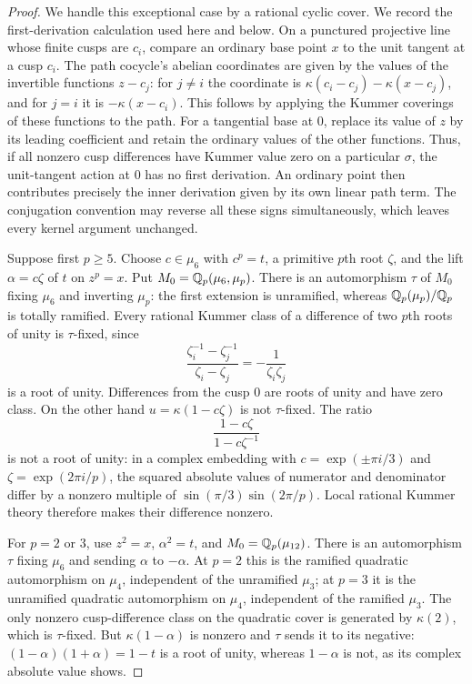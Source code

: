\begin{proof}
We handle this exceptional case by a rational cyclic cover. We record the
first-derivation calculation used here and below. On a punctured projective
line whose finite cusps are $c_i$, compare an ordinary base point $x$ to
the unit tangent at a cusp $c_i$. The path cocycle's abelian coordinates
are given by the values of the invertible functions $z-c_j$: for $j\ne i$
the coordinate is
$\kappa(c_i-c_j)-\kappa(x-c_j)$, and for $j=i$ it is
$-\kappa(x-c_i)$. This follows by applying the Kummer coverings of these
functions to the path. For a tangential base at $0$, replace its value
of $z$ by its leading coefficient and retain the ordinary values of the
other functions. Thus, if all nonzero cusp differences have Kummer value
zero on a particular $\sigma$, the unit-tangent action at $0$ has no
first derivation. An ordinary point then contributes precisely the inner
derivation given by its own linear path term. The conjugation convention
may reverse all these signs simultaneously, which leaves every kernel
argument unchanged.

Suppose first $p\ge5$. Choose $c\in\mu_6$ with $c^p=t$, a primitive
$p$th root $\zeta$, and the lift $\alpha=c\zeta$ of $t$ on $z^p=x$.
Put $M_0=\mathbb Q_p(\mu_6,\mu_p)$. There is an automorphism $\tau$ of $M_0$
fixing $\mu_6$ and inverting $\mu_p$: the first extension is unramified,
whereas $\mathbb Q_p(\mu_p)/\mathbb Q_p$ is totally ramified. Every rational Kummer
class of a difference of two $p$th roots of unity is $\tau$-fixed, since
\[
 \frac{\zeta_i^{-1}-\zeta_j^{-1}}{\zeta_i-\zeta_j}
       =-\frac1{\zeta_i\zeta_j}
\]
is a root of unity. Differences from the cusp $0$ are roots of unity
and have zero class. On the other hand $u=\kappa(1-c\zeta)$ is not
$\tau$-fixed. The ratio
\[
 \frac{1-c\zeta}{1-c\zeta^{-1}}
\]
is not a root of unity: in a complex embedding with
$c=\exp(\pm\pi i/3)$ and $\zeta=\exp(2\pi i/p)$, the squared absolute
values of numerator and denominator differ by a nonzero multiple of
$\sin(\pi/3)\sin(2\pi/p)$. Local rational Kummer theory therefore makes
their difference nonzero.

For $p=2$ or $3$, use $z^2=x$, $\alpha^2=t$, and
$M_0=\mathbb Q_p(\mu_{12})$. There is an automorphism $\tau$ fixing $\mu_6$
and sending $\alpha$ to $-\alpha$. At $p=2$ this is the ramified quadratic
automorphism on $\mu_4$, independent of the unramified $\mu_3$; at $p=3$
it is the unramified quadratic automorphism on $\mu_4$, independent of the
ramified $\mu_3$. The only nonzero cusp-difference class on the quadratic
cover is generated by $\kappa(2)$, which is $\tau$-fixed. But
$\kappa(1-\alpha)$ is nonzero and $\tau$ sends it to its negative:
$(1-\alpha)(1+\alpha)=1-t$ is a root of unity, whereas $1-\alpha$ is not,
as its complex absolute value shows.


\end{proof}
